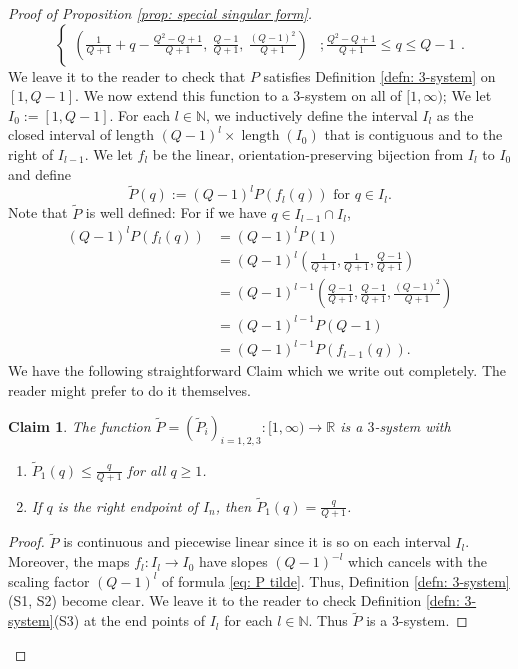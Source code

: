 \documentclass[reqno,11pt, twoside]{amsart}
\theoremstyle{plain}
\newtheorem{claim}{Claim}[thm]
\theoremstyle{definition}
\theoremstyle{definition}
\theoremstyle{remark}
\numberwithin{equation}{section}
\newcommand{\R}{{\mathbb{R}}}
\newcommand{\N}{{\mathbb{N}}}
\newcommand\on[1]{\operatorname{#1}}
\begin{document}
\begin{proof}[Proof of Proposition \ref{prop: special singular form}]
\begin{equation}
\begin{cases}
            \left(\frac{1}{Q+1} + q - \frac{Q^2 - Q + 1}{Q+1},\ \frac{Q-1}{Q+1},\ \frac{(Q-1)^2}{Q+1}\right)     & ; \frac{Q^2 - Q + 1}{Q+1}  \leq q \leq Q-1
		  \end{cases}.
\end{equation}
We leave it to the reader to check that $P$ satisfies Definition \ref{defn: 3-system} on $[1,Q-1]$.
We now extend this function to a $3$-system on all of $[1,\infty)$;
We let $I_0 := [1,Q-1]$. For each $l \in \N$, we inductively define the interval $I_l$ as the closed interval of length $(Q-1)^l \times  \on{length}(I_{0})$ that is contiguous and to the right of $I_{l-1}$.
We let $f_l$ be the linear, orientation-preserving bijection from $I_l$ to $I_0$ and define
\begin{equation}\label{eq: P tilde}
    \widetilde{P}(q) := (Q-1)^l P(f_l(q)) \text{ for } q \in I_l.
\end{equation}
Note that $\widetilde{P}$ is well defined: For if we have $q \in I_{l-1}\cap I_l$,
\begin{equation*}
\begin{split}
    (Q-1)^lP(f_{l}(q)) &= (Q-1)^l P(1) \\
    &= (Q-1)^l\left( \frac{1}{Q+1}, \frac{1}{Q+1}, \frac{Q-1}{Q+1}\right) \\
    &= (Q-1)^{l-1}\left( \frac{Q-1}{Q+1}, \frac{Q-1}{Q+1}, \frac{(Q-1)^2}{Q+1}\right)\\
    &= (Q-1)^{l-1} P(Q-1) \\
    &= (Q-1)^{l-1} P(f_{l-1}(q)).
\end{split}
\end{equation*}
We have the following straightforward Claim which we write out completely. The reader might prefer to do it themselves.
\begin{claim}\label{claim: P inequalities}
    The function $\widetilde{P} = (\widetilde{P}_i)_{i=1,2,3}: [1,\infty) \to \R$ is a $3$-system with 
    \begin{enumerate}
        \item[(a)] $\widetilde{P}_1(q) \leq \frac{q}{Q+1}$ for all $q \geq 1$.
        \item[(b)] If $q$ is the right endpoint of $I_n$, then $\widetilde{P}_1(q) = \frac{q}{Q+1}$.
    \end{enumerate}
    \end{claim}
    \begin{proof}
        $\widetilde{P}$ is continuous and piecewise linear since it is so on each interval $I_l$. Moreover, the maps $f_l: I_l \to I_0$ have slopes $(Q-1)^{-l}$ which cancels with the scaling factor $(Q-1)^l$ of formula  \eqref{eq: P tilde}. Thus, Definition \ref{defn: 3-system}(S1, S2) become clear.
        We leave it to the reader to check Definition \ref{defn: 3-system}(S3) at the end points of $I_l$ for each $l\in \N$. Thus $\widetilde{P}$ is a $3$-system.


\end{proof}
\end{proof}
\end{document}
